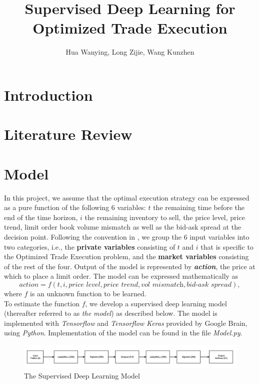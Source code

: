 \documentclass[12pt]{extarticle}
\title{Supervised Deep Learning for Optimized Trade Execution}
\author{Hua Wanying, Long Zijie, Wang Kunzhen}
\begin{document}
\maketitle

\section{Introduction}

\section{Literature Review}

\section{Model}
In this project, we assume that the optimal execution strategy can be expressed as
a pure function of the following 6 variables: $t$ the remaining time before the end of
the time horizon, $i$ the remaining inventory to sell, the price level, price trend,
limit order book volume mismatch as well as the bid-ask spread at the decision point.
Following the convention in \cite{reinforcement}, we group the 6 input variables
into two categories, i.e., the \textbf{private variables} consisting of $t$ and $i$
that is specific to the Optimized Trade Execution problem, and the \textbf{market variables}
consisting of the rest of the four. Output of the model is represented by \textit{\textbf{action}},
the price at which to place a limit order.
The model can be expressed mathematically as
$$ \textit{action} = f(t, i, \textit{price level}, \textit{price trend}, \textit{vol mismatch}, \textit{bid-ask spread}), $$
where $f$ is an unknown function to be learned. \\


\noindent To estimate the function $f$, we develop a supervised deep learning model (thereafter referred to as \textit{the model}) as described below.
The model is implemented with \textit{Tensorflow} and \textit{Tensorflow
Keras} provided by Google Brain, using \textit{Python}.
Implementation of the model can be found in the file \textit{Model.py}.\\


\begin{figure}[h]
\centering
\includegraphics[width=\textwidth]{model}
\caption{The Supervised Deep Learning Model}
\end{figure}
\end{document}

